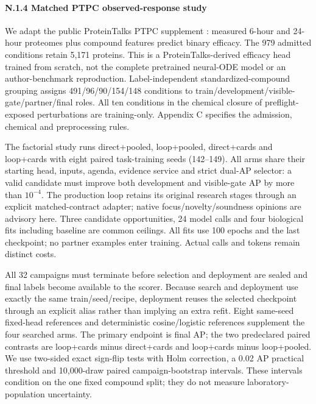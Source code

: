\paragraph{N.1.4 Matched PTPC observed-response study}
We adapt the public ProteinTalks PTPC supplement \citep{Sun2026ProteinTalks}: measured 6-hour and 24-hour proteomes plus compound features predict binary efficacy. The 979 admitted conditions retain 5,171 proteins. This is a ProteinTalks-derived efficacy head trained from scratch, not the complete pretrained neural-ODE model or an author-benchmark reproduction. Label-independent standardized-compound grouping assigns 491/96/90/154/148 conditions to train/development/visible-gate/partner/final roles. All ten conditions in the chemical closure of preflight-exposed perturbations are training-only. Appendix C specifies the admission, chemical and preprocessing rules.

The factorial study runs direct+pooled, loop+pooled, direct+cards and loop+cards with eight paired task-training seeds (142--149). All arms share their starting head, inputs, agenda, evidence service and strict dual-AP selector: a valid candidate must improve both development and visible-gate AP by more than $10^{-4}$. The production loop retains its original research stages through an explicit matched-contract adapter; native focus/novelty/soundness opinions are advisory here. Three candidate opportunities, 24 model calls and four biological fits including baseline are common ceilings. All fits use 100 epochs and the last checkpoint; no partner examples enter training. Actual calls and tokens remain distinct costs.

All 32 campaigns must terminate before selection and deployment are sealed and final labels become available to the scorer. Because search and deployment use exactly the same train/seed/recipe, deployment reuses the selected checkpoint through an explicit alias rather than implying an extra refit. Eight same-seed fixed-head references and deterministic cosine/logistic references supplement the four searched arms. The primary endpoint is final AP; the two predeclared paired contrasts are loop+cards minus direct+cards and loop+cards minus loop+pooled. We use two-sided exact sign-flip tests with Holm correction, a 0.02 AP practical threshold and 10,000-draw paired campaign-bootstrap intervals. These intervals condition on the one fixed compound split; they do not measure laboratory-population uncertainty.

\begingroup
\renewcommand{\thetable}{N.\arabic{table}}
\renewcommand{\theHtable}{N.\arabic{table}}
\setcounter{table}{3}
